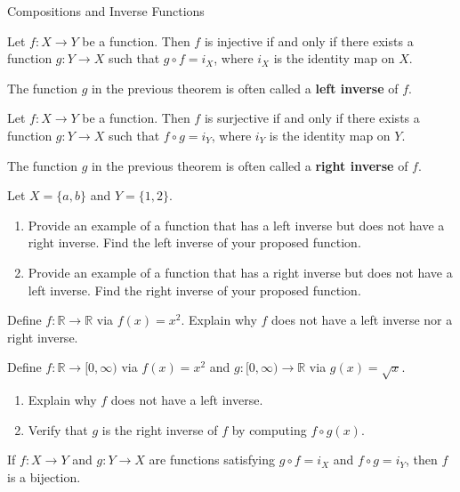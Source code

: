\begin{section}{Compositions and Inverse Functions}
\begin{theorem}
Let $f:X\to Y$ be a function. Then $f$ is injective if and only if there exists a function $g:Y\to X$ such that $g\circ f=i_X$, where $i_X$ is the identity map on $X$.
\end{theorem}

The function $g$ in the previous theorem is often called a \textbf{left inverse} of $f$.

\begin{theorem}
Let $f:X\to Y$ be a function. Then $f$ is surjective if and only if there exists a function $g:Y\to X$ such that $f\circ g=i_Y$, where $i_Y$ is the identity map on $Y$.
\end{theorem}

The function $g$ in the previous theorem is often called a \textbf{right inverse} of $f$.

\begin{problem}
Let $X=\{a,b\}$ and $Y=\{1,2\}$.
\begin{enumerate}[label=\textrm{(\alph*)}]
\item Provide an example of a function that has a left inverse but does not have a right inverse. Find the left inverse of your proposed function.
\item Provide an example of a function that has a right inverse but does not have a left inverse. Find the right inverse of your proposed function.
\end{enumerate}
\end{problem}

\begin{problem}
Define $f:\mathbb{R}\to\mathbb{R}$ via $f(x)=x^2$. Explain why $f$ does not have a left inverse nor a right inverse.
\end{problem}

\begin{problem}
Define $f:\mathbb{R}\to[0,\infty)$ via $f(x)=x^2$ and $g:[0,\infty)\to \mathbb{R}$ via $g(x)=\sqrt{x}$. 
\begin{enumerate}[label=\textrm{(\alph*)}]
\item Explain why $f$ does not have a left inverse.
\item Verify that $g$ is the right inverse of $f$ by computing $f\circ g(x)$.
\end{enumerate}
\end{problem}

\begin{corollary}\label{cor:two-sided inverse}
If $f:X\to Y$ and $g:Y\to X$ are functions satisfying $g\circ f=i_X$ and  $f\circ g=i_Y$, then $f$ is a bijection.
\end{corollary}


\end{section}
